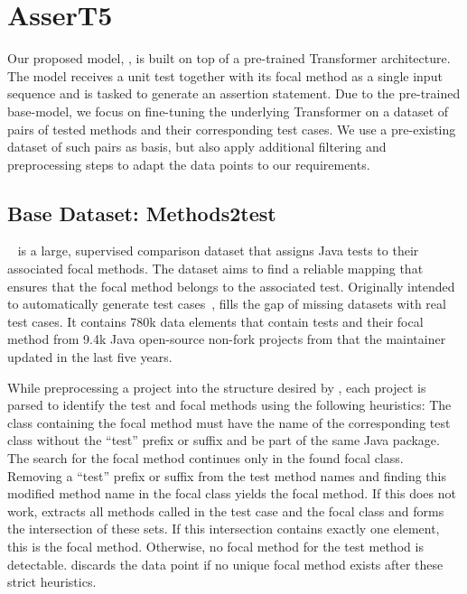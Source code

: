 
\section{AsserT5}

Our proposed model, \assertfive, is built on top of a pre-trained
Transformer architecture. The model receives a unit test together with
its focal method as a single input sequence and is tasked to generate
an assertion statement.
Due to the pre-trained base-model, we focus on fine-tuning the
underlying Transformer on a dataset of pairs of tested methods and
their corresponding test cases. We use a pre-existing dataset of such
pairs as basis, but also apply additional filtering and preprocessing
steps to adapt the data points to our requirements.


\subsection{Base Dataset: Methods2test}\label{sec:methods2test}

\Methodstotest~\cite{Tufano2022a} is a large, supervised comparison
dataset that assigns Java \junit tests to their associated focal
methods. The dataset aims to find a reliable mapping that ensures that
the focal method belongs to the associated test. Originally intended
to automatically generate test cases~\cite{Tufano2020}, \methodstotest
fills the gap of missing datasets with real test cases. It contains
780k data elements that contain \junit tests and their focal method
from 9.4k Java open-source non-fork projects from \github that the
maintainer updated in the last five years.

While preprocessing a project into the structure desired by
\methodstotest, each project is parsed to identify the test and focal
methods using the following heuristics:
The class containing the focal method must have the name of the
corresponding test class without the \enquote{test} prefix or suffix
and be part of the same Java package. The search for the focal method
continues only in the found focal class.
Removing a \enquote{test} prefix or suffix from the test method names
and finding this modified method name in the focal class yields the
focal method.
If this does not work, \methodstotest extracts all methods called in
the test case and the focal class and forms the intersection of these
sets. If this intersection contains exactly one element, this is the
focal method. Otherwise, no focal method for the test method is
detectable.
\Methodstotest discards the data point if no unique focal method
exists after these strict heuristics.

